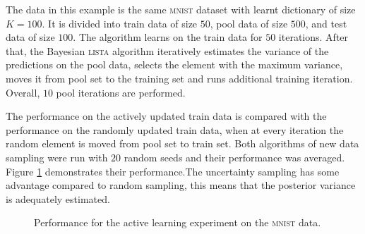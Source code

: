 \documentclass[letterpaper]{article}
\begin{document}
The data in this example is the same \textsc{mnist} dataset with learnt dictionary of size $K=100$. It is divided into train data of size $50$, pool data of size $500$,  and test data of size $100$. The algorithm learns on the train data for $50$ iterations. After that, the Bayesian \textsc{lista} algorithm iteratively estimates the variance of the predictions on the pool data, selects the element with the maximum variance, moves it from pool set to the training set and runs additional training iteration. Overall, $10$ pool iterations are performed.

The performance on the actively updated train data is compared with the performance on the randomly updated train data, when at every iteration the random element is moved from pool set to train set. Both algorithms of new data sampling were run with $20$ random seeds and their performance was averaged. Figure \ref{fig:active_learning_mnist} demonstrates their performance.The uncertainty sampling has some advantage compared to random sampling, this means that the posterior variance is adequately estimated.
\begin{figure}[t]
\centering
{}%
\caption{Performance for the active learning experiment on the \textsc{mnist} data. }
\label{fig:active_learning_mnist}
\end{figure}
\end{document}
